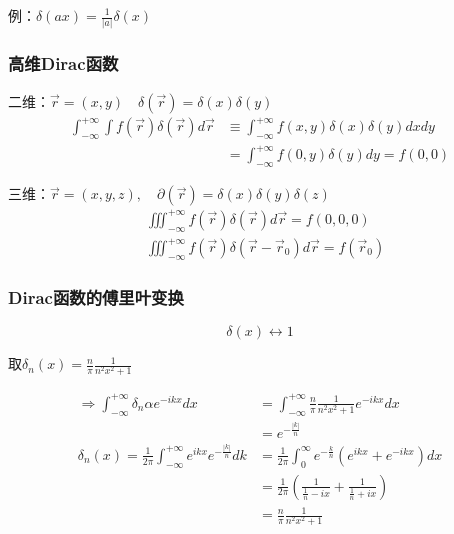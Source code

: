 例：$\delta(ax)=\frac1{|a|}\delta(x)$

\subsubsection{高维Dirac函数}
\noindent 二维：$\vec{r}=(x,y)\quad\delta(\vec{r})=\delta(x)\delta(y)$
$$\begin{aligned}
    \int_{-\infty}^{+\infty}\int f(\vec{r})\delta(\vec{r})d\vec{r}&\equiv\int_{-\infty}^{+\infty}f(x,y)\delta(x)\delta(y)dxdy\\
    &=\int_{-\infty}^{+\infty}f(0,y)\delta(y)dy=f(0,0)
\end{aligned}$$

\noindent 三维：$\vec{r}=(x,y,z),\quad\partial(\vec{r})=\delta(x)\delta(y)\delta(z)$
$$\begin{aligned}
    &\iiint_{-\infty}^{+\infty}f(\vec{r})\delta(\vec{r})d\vec{r}=f(0,0,0)\\
    &\iiint_{-\infty}^{+\infty}f(\vec{r})\delta(\vec{r}-\vec{r}_{0})d\vec{r}=f(\vec{r}_{0})
\end{aligned}$$

\subsubsection{Dirac函数的傅里叶变换}
$$\boxed{\delta(x)\longleftrightarrow1}$$

取$\delta_{n}(x)=\frac{n}{\pi}\frac{1}{n^{2}x^{2}+1}$

$$\begin{aligned}
    \Rightarrow\int_{-\infty}^{+\infty}\delta_{n}\alpha e^{-ikx}dx
    &=\int_{-\infty}^{+\infty}\frac{n}{\pi}\frac{1}{n^{2}x^{2}+1}e^{-ikx}dx\\
    &=e^{-\frac{|k|}{n}}\\
    \delta_{n}(x)=\frac{1}{2\pi}\int_{-\infty}^{+\infty}e^{ikx}e^{-\frac{|k|}{n}}dk
    &=\frac{1}{2\pi}\int_{0}^{\infty}e^{-\frac{k}{n}}(e^{ikx}+e^{-ikx})dx\\
    &=\frac{1}{2\pi}(\frac{1}{\frac{1}{n}-ix}+\frac{1}{\frac{1}{n}+ix})\\
    &=\frac{n}{\pi}\frac{1}{n^{2}x^{2}+1}
\end{aligned}$$


